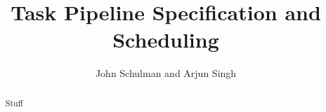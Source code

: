 \documentclass[letterpaper, 10 pt, conference]{ieeeconf}  %
\begin{document}
\title{\LARGE \bf
    Task Pipeline Specification and Scheduling
}

\author{John Schulman and Arjun Singh}

\maketitle


%
%
%
\begin{abstract}
    Stuff
\end{abstract}
\end{document}
